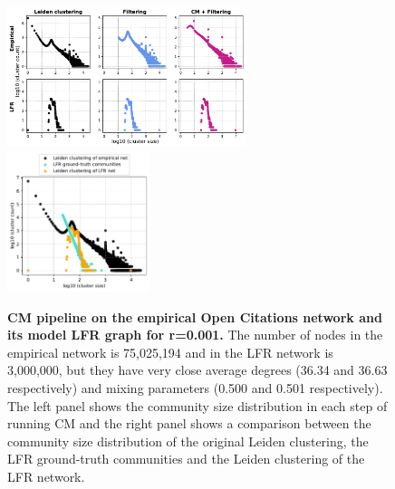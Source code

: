 \documentclass[11pt]{article}   	%
\begin{document}
\begin{figure}[h!]
\centering
\includegraphics[width=0.62\textwidth]{figs/oc_cm_steps_lfr001.pdf}
\includegraphics[width=0.37\textwidth]{figs/oc_001_cm_size.pdf}
\caption[CM pipeline on the empirical Open Citations network and its model LFR graph for r=0.001]{\textbf{CM pipeline on the empirical Open Citations network and its model LFR graph for r=0.001.} The number of nodes in the empirical network is 75,025,194 and in the LFR network is 3,000,000, but they have very close average degrees (36.34 and 36.63 respectively) and mixing parameters (0.500 and 0.501 respectively). The left panel shows the community size distribution in each step of running CM and the right panel shows a comparison between the community size distribution of the original Leiden clustering, the LFR ground-truth communities and the Leiden clustering of the LFR network.}
\label{fig:oc-cm-lfr-001}
\end{figure}
\end{document}
